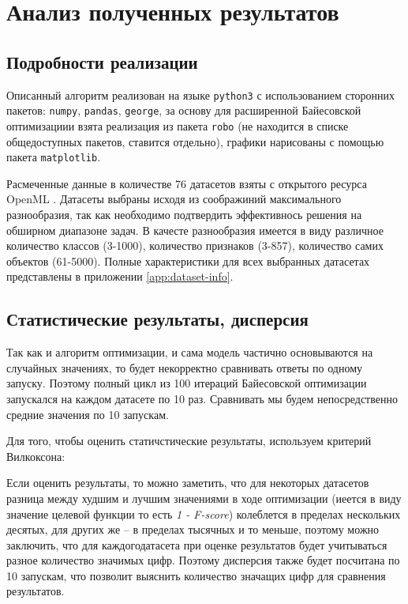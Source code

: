 \documentclass[times,specification,annotation]{itmo-student-thesis}
\begin{document}
	\chapter{Анализ полученных результатов}
	\section{Подробности реализации}
	Описанный алгоритм реализован на языке \texttt{python3} с использованием сторонних пакетов: \texttt{numpy}, \texttt{pandas}, \texttt{george}, за основу для расширенной Байесовской оптимизациии взята реализация из пакета \texttt{robo} (не находится в списке общедоступных пакетов, ставится отдельно), графики нарисованы с помощью пакета \texttt{matplotlib}. \par 
	
	Расмеченные данные в количестве 76 датасетов взяты с открытого ресурса OpenML \cite{OpenML2013}. Датасеты выбраны исходя из соображиний максимального разнообразия, так как необходимо подтвердить эффективнось решения на обширном диапазоне задач. В качесте разнообразия имеется в виду различное количество классов (3-1000), количество признаков (3-857), количество самих объектов (61-5000). Полные характеристики для всех выбранных датасетах представлены в приложении \ref{app:dataset-info}. 
	
	\section{Статистические результаты, дисперсия} \label{s:cox}
	Так как и алгоритм оптимизации, и сама модель частично основываются на случайных значениях, то будет некорректно сравнивать ответы по одному запуску. Поэтому полный цикл из 100 итераций Байесовской оптимизации запускался на каждом датасете по 10 раз. Сравнивать мы будем непосредственно средние значения по 10 запускам. \par 
	
	Для того, чтобы оценить статичстические результаты, используем критерий Вилкоксона: %
	
	
	Если оценить результаты, то можно заметить, что для некоторых датасетов разница между худшим и лучшим значениями в ходе оптимизации (иеется в виду значение целевой функции то есть \textit{1 - F-score}) колеблется в пределах нескольких десятых, для других же -- в пределах тысячных и то меньше, поэтому можно заключить, что для каждогодатасета при оценке результатов будет учитываться разное количество значимых цифр. Поэтому дисперсия также будет посчитана по 10 запускам,  что позволит выяснить количество значащих цифр для сравнения результатов.
\end{document}
